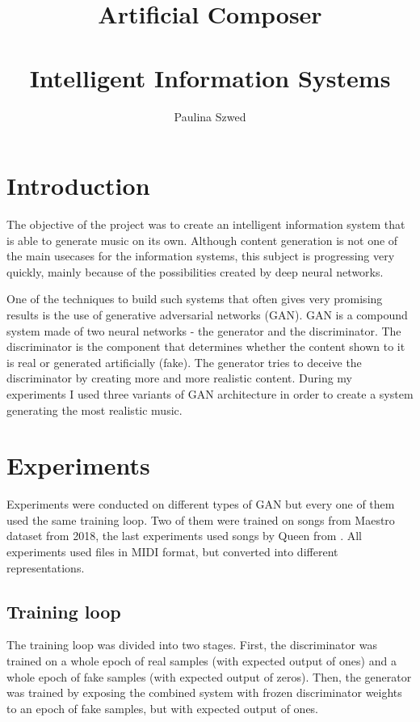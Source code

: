 \documentclass[]{article}
\title{
	Artificial Composer\\
	\texttt{}\\
	\large Intelligent Information Systems}
\author{Paulina Szwed}
\begin{document}
\maketitle

\section{Introduction}

The objective of the project was to create an intelligent information system
that is able to generate music on its own. Although content generation is not one
of the main usecases for the information systems, this subject is progressing
very quickly, mainly because of the possibilities created by deep neural networks.

One of the techniques to build such systems that often gives very promising 
results is the use of generative adversarial networks (GAN). GAN is a compound system made of two neural networks - the generator and the discriminator. The discriminator is the component that determines whether the content shown to it is real or generated artificially (fake). The generator tries to deceive the discriminator by creating more and more realistic content. During my experiments I used three variants of GAN architecture in order to create a system generating the most realistic music.

\section{Experiments}

Experiments were conducted on different types of GAN but every one of them used the same training loop. Two of them were trained on songs from Maestro dataset \cite{hawthorne2018enabling} from 2018, the last experiments used songs by Queen from \cite{queenmidisongs}. All experiments used files in MIDI format, but converted into different representations. 

\subsection{Training loop}

The training loop was divided into two stages. First, the discriminator was trained on a whole epoch of real samples (with expected output of ones) and a whole epoch of fake samples (with expected output of zeros). Then, the generator was trained by exposing the combined system with frozen discriminator weights to an epoch of fake samples, but with expected output of ones. 
\end{document}
